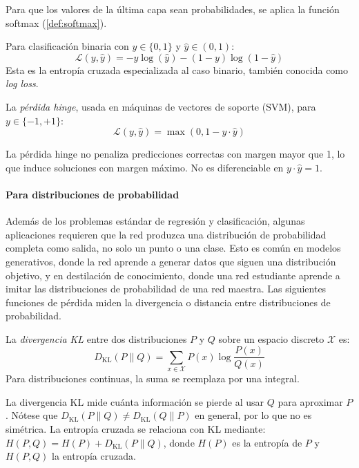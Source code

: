 Para que los valores de la última capa sean probabilidades, se aplica la función softmax (\autoref{def:softmax}).

\begin{definition}\label{def:binary_cross_entropy}
	Para clasificación binaria con \(y \in \{0, 1\}\) y \(\hat{y} \in (0, 1)\):
	\[
		\mathcal{L}(y, \hat{y}) = -y \log(\hat{y}) - (1-y) \log(1 - \hat{y})
	\]
	Esta es la entropía cruzada especializada al caso binario, también conocida como \textit{log loss}.
\end{definition}

\begin{definition}\label{def:hinge_loss}
	La \textit{pérdida hinge}, usada en máquinas de vectores de soporte (SVM), para \(y \in \{-1, +1\}\):
	\[
		\mathcal{L}(y, \hat{y}) = \max(0, 1 - y \cdot \hat{y})
	\]
\end{definition}

La pérdida hinge no penaliza predicciones correctas con margen mayor que 1, lo que induce soluciones con margen máximo. No es diferenciable en \(y \cdot \hat{y} = 1\).

\paragraph{Para distribuciones de probabilidad}

Además de los problemas estándar de regresión y clasificación, algunas aplicaciones requieren que la red produzca una distribución de probabilidad completa como salida, no solo un punto o una clase. Esto es común en modelos generativos, donde la red aprende a generar datos que siguen una distribución objetivo, y en destilación de conocimiento, donde una red estudiante aprende a imitar las distribuciones de probabilidad de una red maestra. Las siguientes funciones de pérdida miden la divergencia o distancia entre distribuciones de probabilidad.

\begin{definition}\label{def:kl_divergence}
	La \textit{divergencia KL} entre dos distribuciones \(P\) y \(Q\) sobre un espacio discreto \(\mathcal{X}\) es:
	\[
		D_{\text{KL}}(P \| Q) = \sum_{x \in \mathcal{X}} P(x) \log \frac{P(x)}{Q(x)}
	\]
	Para distribuciones continuas, la suma se reemplaza por una integral.
\end{definition}

La divergencia \gls{KL} mide cuánta información se pierde al usar \(Q\) para aproximar \(P\). Nótese que \(D_{\text{KL}}(P \| Q) \neq D_{\text{KL}}(Q \| P)\) en general, por lo que no es simétrica. La entropía cruzada se relaciona con \gls{KL} mediante: \(H(P, Q) = H(P) + D_{\text{KL}}(P \| Q)\), donde \(H(P)\) es la entropía de \(P\) y \(H(P, Q)\) la entropía cruzada.

